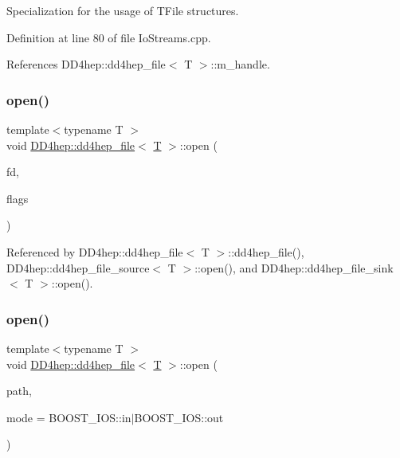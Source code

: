 Specialization for the usage of T\+File structures. 



Definition at line 80 of file Io\+Streams.\+cpp.



References D\+D4hep\+::dd4hep\+\_\+file$<$ T $>$\+::m\+\_\+handle.

\hypertarget{class_d_d4hep_1_1dd4hep__file_a5f7da6679da9dbc31f37c85e51d7dd94}{}\label{class_d_d4hep_1_1dd4hep__file_a5f7da6679da9dbc31f37c85e51d7dd94} 
\subsubsection{\texorpdfstring{open()}{open()}\hspace{0.1cm}{\footnotesize\ttfamily [3/4]}}
{\footnotesize\ttfamily template$<$typename T $>$ \\
void \hyperlink{class_d_d4hep_1_1dd4hep__file}{D\+D4hep\+::dd4hep\+\_\+file}$<$ \hyperlink{class_t}{T} $>$\+::open (\begin{DoxyParamCaption}\item[{\hyperlink{class_d_d4hep_1_1dd4hep__file_a4d79f8d433cd7831ff818691424cd6fc}{handle\+\_\+type}}]{fd,  }\item[{\hyperlink{namespace_d_d4hep_a31d19f9b0ce567067d2897fbda1761e5}{dd4hep\+\_\+file\+\_\+flags}}]{flags }\end{DoxyParamCaption})}



Referenced by D\+D4hep\+::dd4hep\+\_\+file$<$ T $>$\+::dd4hep\+\_\+file(), D\+D4hep\+::dd4hep\+\_\+file\+\_\+source$<$ T $>$\+::open(), and D\+D4hep\+::dd4hep\+\_\+file\+\_\+sink$<$ T $>$\+::open().

\hypertarget{class_d_d4hep_1_1dd4hep__file_a44e65364ed22ce152f237541e0391dcc}{}\label{class_d_d4hep_1_1dd4hep__file_a44e65364ed22ce152f237541e0391dcc} 
\subsubsection{\texorpdfstring{open()}{open()}\hspace{0.1cm}{\footnotesize\ttfamily [4/4]}}
{\footnotesize\ttfamily template$<$typename T $>$ \\
void \hyperlink{class_d_d4hep_1_1dd4hep__file}{D\+D4hep\+::dd4hep\+\_\+file}$<$ \hyperlink{class_t}{T} $>$\+::open (\begin{DoxyParamCaption}\item[{const char $\ast$}]{path,  }\item[{B\+O\+O\+S\+T\+\_\+\+I\+O\+S\+::openmode}]{mode = {\ttfamily BOOST\+\_\+IOS\+:\+:in$\vert$BOOST\+\_\+IOS\+:\+:out} }\end{DoxyParamCaption})}

